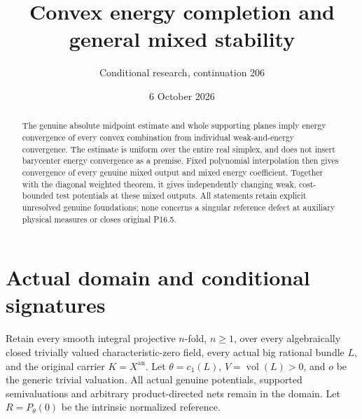 \documentclass[11pt]{article}
\title{Convex energy completion and general mixed stability}
\author{Conditional research, continuation 206}
\date{6 October 2026}
\begin{document}
\maketitle
\begin{abstract}
The genuine absolute midpoint estimate and whole supporting
planes imply energy convergence of every convex combination
from individual weak-and-energy convergence. The estimate is
uniform over the entire real simplex, and does not insert
barycenter energy convergence as a premise. Fixed polynomial
interpolation then gives convergence of every genuine mixed
output and mixed energy coefficient. Together with the
diagonal weighted theorem, it gives independently changing
weak, cost-bounded test potentials at these mixed outputs.
All statements retain explicit unresolved genuine foundations;
none concerns a singular reference defect at auxiliary
physical measures or closes original P16.5.
\end{abstract}

\section{Actual domain and conditional signatures}
Retain every smooth integral projective $n$-fold, $n\geq1$,
over every algebraically closed trivially valued
characteristic-zero field, every actual big rational bundle
$L$, and the original carrier $K=X^{\mathrm{an}}$.
Let $\theta=c_1(L)$, $V=\operatorname{vol}(L)>0$,
and $o$ be the generic trivial valuation.
All actual genuine potentials, supported semivaluations
and arbitrary product-directed nets remain in the domain.
Let $R=P_\theta(0)$ be the intrinsic normalized reference.
\end{document}
